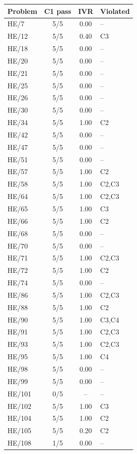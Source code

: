 \documentclass[11pt]{article}
\begin{document}
\begin{table}[ht]
\centering
\small
\begin{tabular}{@{}lccl@{}}
\toprule
\textbf{Problem} & \textbf{C1 pass} & \textbf{IVR} & \textbf{Violated} \\
\midrule
HE/7 & 5/5 & 0.00 & -- \\
HE/12 & 5/5 & 0.40 & C3 \\
HE/18 & 5/5 & 0.00 & -- \\
HE/20 & 5/5 & 0.00 & -- \\
HE/21 & 5/5 & 0.00 & -- \\
HE/25 & 5/5 & 0.00 & -- \\
HE/26 & 5/5 & 0.00 & -- \\
HE/30 & 5/5 & 0.00 & -- \\
HE/34 & 5/5 & 1.00 & C2 \\
HE/42 & 5/5 & 0.00 & -- \\
HE/47 & 5/5 & 0.00 & -- \\
HE/51 & 5/5 & 0.00 & -- \\
HE/57 & 5/5 & 1.00 & C2 \\
HE/58 & 5/5 & 1.00 & C2,C3 \\
HE/64 & 5/5 & 1.00 & C2,C3 \\
HE/65 & 5/5 & 1.00 & C3 \\
HE/66 & 5/5 & 1.00 & C2 \\
HE/68 & 5/5 & 0.00 & -- \\
HE/70 & 5/5 & 0.00 & -- \\
HE/71 & 5/5 & 1.00 & C2,C3 \\
HE/72 & 5/5 & 1.00 & C2 \\
HE/74 & 5/5 & 0.00 & -- \\
HE/86 & 5/5 & 1.00 & C2,C3 \\
HE/88 & 5/5 & 1.00 & C2 \\
HE/90 & 5/5 & 1.00 & C3,C4 \\
HE/91 & 5/5 & 1.00 & C2,C3 \\
HE/93 & 5/5 & 1.00 & C2,C3 \\
HE/95 & 5/5 & 1.00 & C4 \\
HE/98 & 5/5 & 0.00 & -- \\
HE/99 & 5/5 & 0.00 & -- \\
HE/101 & 0/5 & -- & -- \\
HE/102 & 5/5 & 1.00 & C3 \\
HE/104 & 5/5 & 1.00 & C2 \\
HE/105 & 5/5 & 0.20 & C2 \\
HE/108 & 1/5 & 0.00 & -- \\

\end{tabular}
\end{table}
\end{document}
